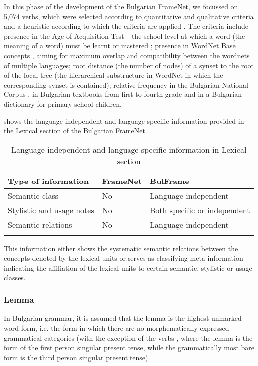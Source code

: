 \documentclass[output=paper,colorlinks,citecolor=brown]{langscibook}
\begin{document}
In this phase of the development of the Bulgarian FrameNet, we focussed on 5,074 verbs, which were selected according to quantitative and qualitative criteria and a heuristic according to which the criteria are applied \citep[207–208]{koeva-doychev-2022-ontology}. The criteria include presence in the Age of Acquisition Test -- the school level at which a word (the meaning of a word) must be learnt or mastered \citep{dale1981,goodman_dale_li_2008,morrison1997}; presence in WordNet Base concepts \citep[12--14]{Vossen1998}, aiming for maximum overlap and compatibility between the wordnets of multiple languages; root distance (the number of nodes) of a synset to the root of the local tree (the hierarchical substructure in WordNet in which the corresponding synset is contained); relative frequency in the Bulgarian National Corpus \citep{Koeva2012}, in Bulgarian textbooks from first to fourth grade and in a Bulgarian dictionary for primary school children.

 shows the language-independent and language-specific information provided in the Lexical section of the Bulgarian FrameNet.

\begin{table}
    \begin{tabular}{lll}
     \lsptoprule
     Type of information & FrameNet  & BulFrame  \\\midrule
     Semantic class & No & Language-independent\\
     Stylistic and usage notes & No & Both specific or independent\\
     Semantic relations & No & Language-independent\\
     \lspbottomrule
    \end{tabular}
    \caption{Language-independent and language-specific information in Lexical section}
    \label{tab:my_label3}
\end{table}

This information either shows the systematic semantic relations between the  concepts denoted by the lexical units or serves as classifying meta-information indicating the affiliation of the lexical units to certain semantic, stylistic or usage classes.

\subsubsection{Lemma}

In Bulgarian grammar, it is assumed that the lemma is the highest unmarked word form, i.e. the form in which there are no morphematically expressed grammatical categories (with the exception of the verbs \citep[20]{kutsarov2007}, where the lemma is the form of the first person singular present tense, while the grammatically most bare form is the third person singular present tense).
\end{document}
